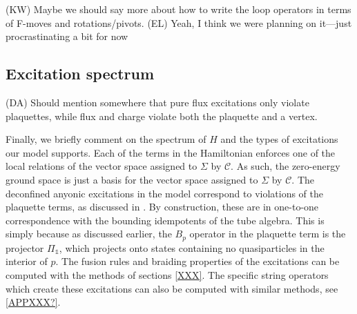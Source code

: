 \documentclass[12pt,a4paper]{article}
\newcounter{arrow}
\newcommand{\unit}{\mathds{1}}
\newcommand{\mcc}{\mathcal{C}}
\newcommand{\dave}[1]{{\color{ao(english)}\footnotesize{(DA) #1}}}
\newcommand{\ethan}[1]{{\color{amethyst}\footnotesize{(EL) #1}}}
\newcommand{\kw}[1]{{\color{kwcolor}\footnotesize{(KW) #1}}}
\newcommand{\Bpa}{\mathord{\vcenter{\hbox{\texttt{[image: Bpa.pdf]}}}}}
\newcommand{\Bpb}{\mathord{\vcenter{\hbox{\texttt{[image: Bpb.pdf]}}}}}
\newcommand{\Bpc}{\mathord{\vcenter{\hbox{\texttt{[image: Bpc.pdf]}}}}}
\newcommand{\Bpd}{\mathord{\vcenter{\hbox{\texttt{[image: Bpd.pdf]}}}}}
\newcommand{\Bpe}{\mathord{\vcenter{\hbox{\texttt{[image: Bpe.pdf]}}}}}
\newcommand{\Bpf}{\mathord{\vcenter{\hbox{\texttt{[image: Bpf.pdf]}}}}}
\newcommand{\Bpg}{\mathord{\vcenter{\hbox{\texttt{[image: Bpg.pdf]}}}}}
\newcommand{\Bph}{\mathord{\vcenter{\hbox{\texttt{[image: Bph.pdf]}}}}}
\newcommand{\Bpi}{\mathord{\vcenter{\hbox{\texttt{[image: Bpi.pdf]}}}}}
\newcommand{\PlaquettePrime}{\mathord{\vcenter{\hbox{\texttt{[image: PlaquettePrime.pdf]}}}}}
\begin{document}
\kw{Maybe we should say more about how to write the loop operators in terms of F-moves and rotations/pivots.}
\ethan{Yeah, I think we were planning on it---just procrastinating a bit for now}



\subsection{Excitation spectrum} \label{excitations_of_H}
\dave{Should mention somewhere that pure flux excitations only violate plaquettes, while flux and charge violate both the plaquette and a vertex.}

Finally, we briefly comment on the spectrum of $H$ and the types of excitations our model supports. 
Each of the terms in the Hamiltonian enforces one of the local relations of the vector space assigned to $\Sigma$ by $\mcc$. 
As such, the zero-energy ground space is just a basis for the vector space assigned to $\Sigma$ by $\mcc$.
The deconfined anyonic excitations in the model correspond to violations of the plaquette terms, as discussed in \cite{blah blah blah}.
By construction, these are in one-to-one correspondence with the bounding idempotents of the tube algebra. 
This is simply because as discussed earlier, the $B_p$ operator in the plaquette term is the projector $\Pi_\unit$, which projects onto states containing no quasiparticles in the interior of $p$. 
The fusion rules and braiding properties of the excitations can be computed with the methods of sections \ref{XXX}.
The specific string operators which create these excitations can also be computed with similar methods, see \ref{APPXXX?}.
\end{document}
